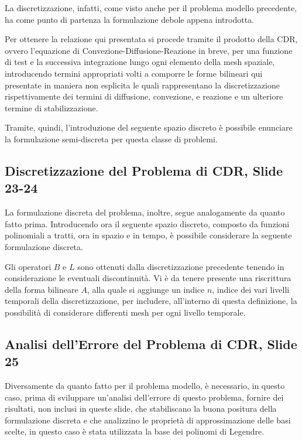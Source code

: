 \documentclass[12pt]{article}
\begin{document}
    La discretizzazione, infatti, come visto anche per il problema modello precedente, ha come punto di partenza la formulazione debole appena introdotta.

    Per ottenere la relazione qui presentata si procede tramite il prodotto della CDR, ovvero l'equazione di Convezione-Diffusione-Reazione in breve, per una funzione di test e la successiva integrazione lungo ogni elemento della mesh spaziale, introducendo termini appropriati volti a comporre le forme bilineari qui presentate in maniera non esplicita le quali rappresentano la discretizzazione rispettivamente dei termini di diffusione, convezione, e reazione e un ulteriore termine di stabilizzazione.

    Tramite, quindi, l'introduzione del seguente spazio discreto è possibile enunciare la formulazione semi-discreta per questa classe di problemi.

    \subsection{Discretizzazione del Problema di CDR, Slide 23-24}

    La formulazione discreta del problema, inoltre, segue analogamente da quanto fatto prima. Introducendo ora il seguente spazio discreto, composto da funzioni polinomiali a tratti, ora in spazio e in tempo, è possibile considerare la seguente formulazione discreta.

    Gli operatori $B$ e $L$ sono ottenuti dalla discretizzazione precedente tenendo in considerazione le eventuali discontinuità. Vi è da tenere presente una riscrittura della forma bilineare $A$, alla quale si aggiunge un indice $n$, indice dei vari livelli temporali della discretizzazione, per includere, all'interno di questa definizione, la possibilità di considerare differenti mesh per ogni livello temporale.

    \subsection{Analisi dell'Errore del Problema di CDR, Slide 25}

    Diversamente da quanto fatto per il problema modello, è necessario, in questo caso, prima di sviluppare un'analisi dell'errore di questo problema, fornire dei risultati, non inclusi in queste slide, che stabiliscano la buona positura della formulazione discreta e che analizzino le proprietà di approssimazione delle basi scelte, in questo caso è stata utilizzata la base dei polinomi di Legendre.
\end{document}
